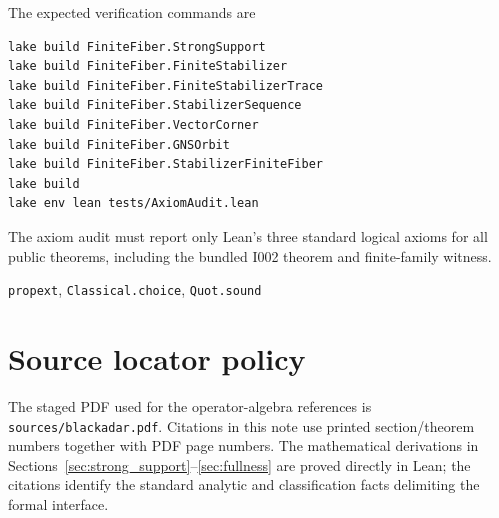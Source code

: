 \documentclass[11pt,reqno]{amsart}
\numberwithin{equation}{section}
\theoremstyle{definition}
\theoremstyle{remark}
\begin{document}
The expected verification commands are
\begin{verbatim}
lake build FiniteFiber.StrongSupport
lake build FiniteFiber.FiniteStabilizer
lake build FiniteFiber.FiniteStabilizerTrace
lake build FiniteFiber.StabilizerSequence
lake build FiniteFiber.VectorCorner
lake build FiniteFiber.GNSOrbit
lake build FiniteFiber.StabilizerFiniteFiber
lake build
lake env lean tests/AxiomAudit.lean
\end{verbatim}
The axiom audit must report only Lean's three standard logical axioms for all
public theorems, including the bundled I002 theorem and finite-family witness.
\begin{center}
\texttt{propext}, \texttt{Classical.choice}, \texttt{Quot.sound}
\end{center}

\section{Source locator policy}
\label{sec:sources}

The staged PDF used for the operator-algebra references is
\texttt{sources/blackadar.pdf}.  Citations in this note use printed
section/theorem numbers together with PDF page numbers.  The mathematical
derivations in Sections~\ref{sec:strong_support}--\ref{sec:fullness} are
proved directly in Lean; the citations identify the standard analytic and
classification facts delimiting the formal interface.
\end{document}
